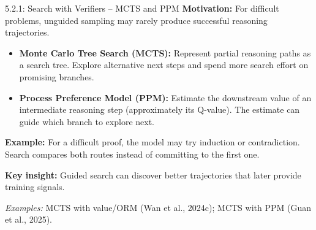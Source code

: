 \documentclass[aspectratio=169]{beamer}
\begin{document}
\begin{frame}{5.2.1: Search with Verifiers -- MCTS and PPM}
\small
\textbf{Motivation:} For difficult problems, unguided sampling may rarely produce successful reasoning trajectories.

\vspace{0.2cm}
\begin{itemize}
    \item \textbf{Monte Carlo Tree Search (MCTS):}
    Represent partial reasoning paths as a search tree. Explore alternative next steps and spend more search effort on promising branches.

    \vspace{0.15cm}
    \item \textbf{Process Preference Model (PPM):}
    Estimate the downstream value of an intermediate reasoning step (approximately its Q-value). The estimate can guide which branch to explore next.
\end{itemize}

\vspace{0.2cm}
\textbf{Example:} For a difficult proof, the model may try induction or contradiction. Search compares both routes instead of committing to the first one.

\vspace{0.15cm}
\textbf{Key insight:} Guided search can discover better trajectories that later provide training signals.

{\scriptsize \textit{Examples:} MCTS with value/ORM (Wan et al., 2024c); MCTS with PPM (Guan et al., 2025).}

\end{frame}
\end{document}
